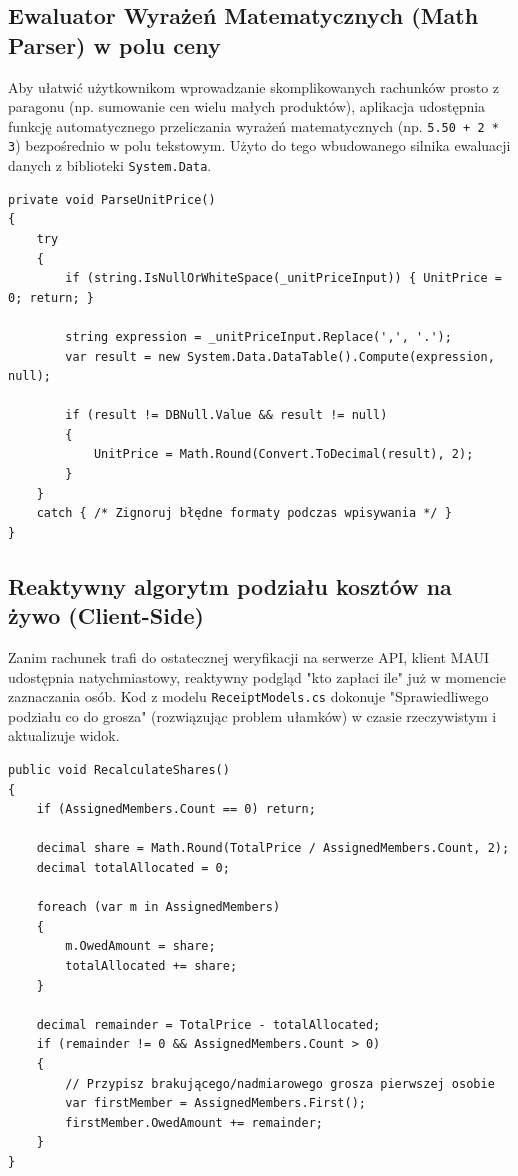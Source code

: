 \documentclass[12pt, a4paper]{article}
\begin{document}
\subsection{Ewaluator Wyrażeń Matematycznych (Math Parser) w polu ceny}
Aby ułatwić użytkownikom wprowadzanie skomplikowanych rachunków prosto z paragonu (np. sumowanie cen wielu małych produktów), aplikacja udostępnia funkcję automatycznego przeliczania wyrażeń matematycznych (np. \texttt{5.50 + 2 * 3}) bezpośrednio w polu tekstowym. Użyto do tego wbudowanego silnika ewaluacji danych z biblioteki \texttt{System.Data}.
\begin{center}
\begin{verbatim}
private void ParseUnitPrice()
{
    try
    {
        if (string.IsNullOrWhiteSpace(_unitPriceInput)) { UnitPrice = 0; return; }
        
        string expression = _unitPriceInput.Replace(',', '.');
        var result = new System.Data.DataTable().Compute(expression, null);
        
        if (result != DBNull.Value && result != null)
        {
            UnitPrice = Math.Round(Convert.ToDecimal(result), 2);
        }
    }
    catch { /* Zignoruj błędne formaty podczas wpisywania */ }
}
\end{verbatim}
\end{center}

\subsection{Reaktywny algorytm podziału kosztów na żywo (Client-Side)}
Zanim rachunek trafi do ostatecznej weryfikacji na serwerze API, klient MAUI udostępnia natychmiastowy, reaktywny podgląd "kto zapłaci ile" już w momencie zaznaczania osób. Kod z modelu \texttt{ReceiptModels.cs} dokonuje "Sprawiedliwego podziału co do grosza" (rozwiązując problem ułamków) w czasie rzeczywistym i aktualizuje widok.
\begin{center}
\begin{verbatim}
public void RecalculateShares()
{
    if (AssignedMembers.Count == 0) return;

    decimal share = Math.Round(TotalPrice / AssignedMembers.Count, 2);
    decimal totalAllocated = 0;

    foreach (var m in AssignedMembers)
    {
        m.OwedAmount = share;
        totalAllocated += share;
    }

    decimal remainder = TotalPrice - totalAllocated;
    if (remainder != 0 && AssignedMembers.Count > 0)
    {
        // Przypisz brakującego/nadmiarowego grosza pierwszej osobie
        var firstMember = AssignedMembers.First();
        firstMember.OwedAmount += remainder;
    }
}
\end{verbatim}
\end{center}
\end{document}
